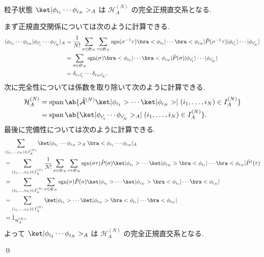 \documentclass[uplatex,dvipdfmx,a4paper,11pt]{jlreq}
\makeatletter
\DeclareMathOperator{\sgn}{sgn}
\DeclareMathOperator{\Span}{span}
\newcommand{\HH}{\mathcal{H}}
\renewcommand{\SS}{\mathfrak{S}}
\newcommand{\A}{\mathcal{A}}
\numberwithin{equation}{section}
\theoremstyle{definition}
\renewenvironment{proof}[1][\proofname]{\par
  \normalfont
  \topsep6\p@\@plus6\p@ \trivlist
  \item[\hskip\labelsep{\bfseries #1}\@addpunct{\bfseries}]\ignorespaces\quad\par
}{
  \qed\endtrivlist\@endpefalse
}
\renewcommand\proofname{証明}
\makeatother
\begin{document}
\begin{proposition}[Q21-21(iii)(iv)(v)]
  粒子状態 $\ket|\phi_{i_1}\cdots\phi_{i_N}>_A$ は $\HH_A^{(N)}$ の完全正規直交系となる.
  \label{asymmetric completely orthonormal system}
\end{proposition}
\begin{proof}
  まず正規直交関係については次のように計算できる.
  \begin{align}
    \langle\phi_{i_1}\cdots\phi_{i_N}|\phi_{i_1'}\cdots\phi_{i_N'}\rangle_A & = \frac{1}{N!}\sum_{\sigma\in\SS_N}\sum_{\tau\in\SS_N}\sgn(\sigma^{-1}\tau)\bra<\phi_{i_1}|\cdots\bra<\phi_{i_N}|\hat{P}(\sigma^{-1}\tau)|\phi_{i_1'}\rangle\cdots|\phi_{i_N'}\rangle \\
                                                                            & = \sum_{\sigma\in\SS_N}\sgn(\sigma)\bra<\phi_{i_1}|\cdots\bra<\phi_{i_N}|\hat{P}(\sigma)|\phi_{i_1'}\rangle\cdots|\phi_{i_N'}\rangle                                                  \\
                                                                            & = \delta_{i_1i_1'}\cdots\delta_{i_Ni_N'}.
  \end{align}
  次に完全性については係数を取り除いて次のように計算できる.
  \begin{align}
    \HH_A^{(N)} & = \Span\ab\{\hat{\A}^{(N)}\ket|\phi_{i_1}>\cdots\ket|\phi_{i_N}> \mid (i_1,\ldots,i_N)\in I_A^{(N)} \} \\
                & = \Span\ab\{\ket|\phi_{i_1'}\cdots\phi_{i_N'}>_A \mid (i_1,\ldots,i_N)\in I_A^{(N)} \}.
  \end{align}
  最後に完備性については次のように計算できる.
  \begin{align}
     & \sum_{(i_1,\ldots,i_N)\in I_A^{(N)}}\ket|\phi_{i_1}\cdots\phi_{i_N}>_A\bra<\phi_{i_1}\cdots\phi_{i_N}|_A                                                                                                                   \\
     & = \sum_{(i_1,\ldots,i_N)\in I_A^{(N)}}\frac{1}{N!}\sum_{\sigma\in\SS_N}\sum_{\tau\in\SS_N}\sgn(\sigma\tau)\hat{P}(\sigma)\ket|\phi_{i_1}>\cdots\ket|\phi_{i_N}>\bra<\phi_{i_1}|\cdots\bra<\phi_{i_N}|\hat{P}^\dagger(\tau) \\
     & = \sum_{(i_1,\ldots,i_N)\in I_A^{(N)}}\sum_{\sigma\in\SS_N}\sgn(\sigma)\hat{P}(\sigma)\ket|\phi_{i_1}>\cdots\ket|\phi_{i_N}>\bra<\phi_{i_1}|\cdots\bra<\phi_{i_N}|                                                         \\
     & = \sum_{(i_1,\ldots,i_N)\in I_A^{(N)}}\ket|\phi_{i_1}>\cdots\ket|\phi_{i_N}>\bra<\phi_{i_1}|\cdots\bra<\phi_{i_N}|                                                                                                         \\
     & = \hat{1}_{\HH_A^{(N)}}.
  \end{align}
  よって $\ket|\phi_{i_1}\cdots\phi_{i_N}>_A$ は $\HH_A^{(N)}$ の完全正規直交系となる.
\end{proof}
\end{document}
